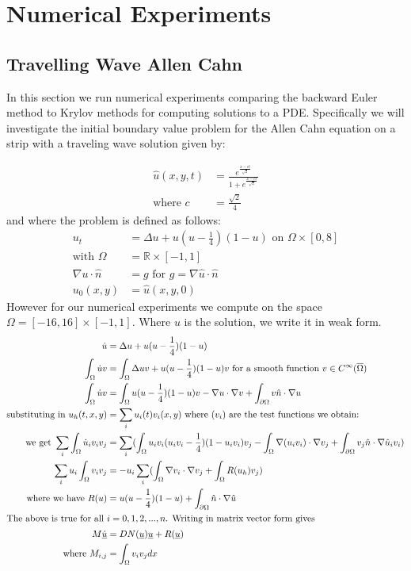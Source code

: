 \section{Numerical Experiments}

\subsection{Travelling Wave Allen Cahn}
In this section we run numerical experiments comparing the backward Euler method to Krylov methods for computing solutions to a PDE.
Specifically we will investigate the initial boundary value problem for the Allen Cahn equation on a strip with a traveling wave solution\cite{YukitakaFukao2004} given by:

\begin{align*}
    \hat u(x,y,t)&=\frac{e^{\frac{x-ct}{\sqrt2}}}{1+e^{\frac{x-ct}{\sqrt2}}} \label{TravelingWaveSol}\\
    \text{where } c &= \frac{\sqrt{2}}{4}
\end{align*}
and where the problem is defined as follows:
\begin{align*}
    u_t&=\Delta u+u(u-\frac14)(1-u) \text{ on $\Omega \times [0, 8]$}\\
    \text{with } \Omega &= \mathbb{R}\times[-1,1]\\
    \nabla u \cdot \hat n &= g \text{ for $g = \nabla \hat u \cdot \hat n$}\\
    u_0(x, y) &= \hat u(x,y, 0)
\end{align*}
However for our numerical experiments we compute on the space $\Omega=[-16,16]\times[-1,1]$.
Where $u$ is the solution, we write it in weak form.
\begin{align*}
    \dot u&=\Delta u+u(u-\frac14)(1-u)\\
    \int_{\Omega} \dot u v &=\int_{\Omega} \Delta uv+u(u-\frac14)(1-u)v \text{ for a smooth function $v \in C^{\infty}(\overline{\Omega})$}\\
    \int_{\Omega} \dot u v &=\int_{\Omega} u(u-\frac14)(1-u)v - \nabla u \cdot \nabla v + \int_{\partial\Omega}  v\hat n \cdot \nabla u\\
    \text{substituting in } u_h(t,x,y) &= \sum_i u_i(t) v_i(x,y) \text{ where $(v_i)$ are the test functions we obtain:}\\
    \text{we get } \sum_i\int_{\Omega} \dot u_i v_i v_j &=\sum_i(\int_{\Omega} u_iv_i(u_iv_i-\frac14)(1-u_iv_i)v_j - \int_{\Omega}\nabla (u_iv_i) \cdot \nabla v_j + \int_{\partial\Omega}  v_j\hat n \cdot \nabla \hat u_iv_i)\\
    \sum_iu_i\int_{\Omega}v_iv_j &= -u_i\sum_i(\int_{\Omega}\nabla v_i \cdot \nabla v_j + \int_{\Omega}R(u_h)v_j)\\
    \text{where we have } R(u)&=u(u-\frac14)(1-u) + \int_{\partial\Omega}  \hat n \cdot \nabla \hat  u\\
    \intertext{The above is true for all $i=0,1,2,...,n$. Writing in matrix vector form gives}
    M \underline{\dot u} &= DN(\underline{u})\underline{u} + R(\underline{u})\\
    \text{where } M_{i,j} &= \int_{\Omega}v_iv_jdx
\end{align*}
